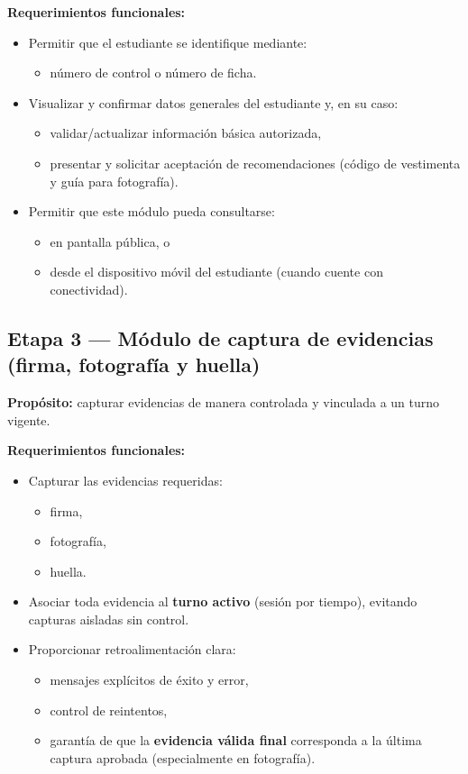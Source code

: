 \documentclass[12pt,a4paper]{article}
\begin{document}
\textbf{Requerimientos funcionales:}
\begin{itemize}
  \item Permitir que el estudiante se identifique mediante:
  \begin{itemize}
    \item número de control o número de ficha.
  \end{itemize}
  \item Visualizar y confirmar datos generales del estudiante y, en su caso:
  \begin{itemize}
    \item validar/actualizar información básica autorizada,
    \item presentar y solicitar aceptación de recomendaciones (código de vestimenta y guía para fotografía).
  \end{itemize}
  \item Permitir que este módulo pueda consultarse:
  \begin{itemize}
    \item en pantalla pública, o
    \item desde el dispositivo móvil del estudiante (cuando cuente con conectividad).
  \end{itemize}
\end{itemize}

\subsection{Etapa 3 --- Módulo de captura de evidencias (firma, fotografía y huella)}
\textbf{Propósito:} capturar evidencias de manera controlada y vinculada a un turno vigente.

\textbf{Requerimientos funcionales:}
\begin{itemize}
  \item Capturar las evidencias requeridas:
  \begin{itemize}
    \item firma,
    \item fotografía,
    \item huella.
  \end{itemize}
  \item Asociar toda evidencia al \textbf{turno activo} (sesión por tiempo), evitando capturas aisladas sin control.
  \item Proporcionar retroalimentación clara:
  \begin{itemize}
    \item mensajes explícitos de éxito y error,
    \item control de reintentos,
    \item garantía de que la \textbf{evidencia válida final} corresponda a la última captura aprobada (especialmente en fotografía).
  \end{itemize}
\end{itemize}
\end{document}
